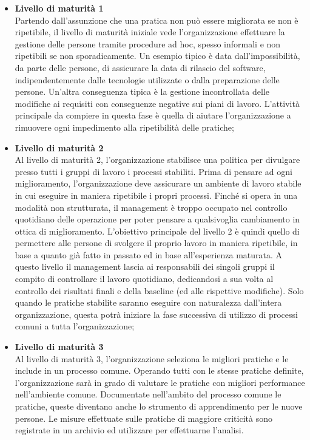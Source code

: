 \begin{itemize}
\item \textbf{Livello di maturità 1}\\
Partendo dall'assunzione che una pratica non può essere migliorata se non è ripetibile, il livello di maturità iniziale vede l'organizzazione effettuare la gestione delle persone tramite procedure ad hoc, spesso informali e non ripetibili se non sporadicamente. Un esempio tipico è data dall'impossibilità, da parte delle persone, di assicurare la data di rilascio del software, indipendentemente dalle tecnologie utilizzate o dalla preparazione delle persone. Un'altra conseguenza tipica è la gestione incontrollata delle modifiche ai requisiti con conseguenze negative sui piani di lavoro.
L'attività principale da compiere in questa fase è quella di aiutare l'organizzazione a rimuovere ogni impedimento alla ripetibilità delle pratiche;
\item \textbf{Livello di maturità 2}\\
Al livello di maturità 2, l'organizzazione stabilisce una politica per divulgare presso tutti i gruppi di lavoro i processi stabiliti. Prima di pensare ad ogni miglioramento, l'organizzazione deve assicurare un ambiente di lavoro stabile in cui eseguire in maniera ripetibile i propri processi. Finché si opera in una modalità non strutturata, il management è troppo occupato nel controllo quotidiano delle operazione per poter pensare a qualsivoglia cambiamento in ottica di miglioramento. L'obiettivo principale del livello 2 è quindi quello di permettere alle persone di svolgere il proprio lavoro in maniera ripetibile, in base a quanto già fatto in passato ed in base all'esperienza maturata. A questo livello il management lascia ai responsabili dei singoli gruppi il compito di controllare il lavoro quotidiano, dedicandosi a sua volta al controllo dei risultati finali e della baseline (ed alle rispettive modifiche).
Solo quando le pratiche stabilite saranno eseguire con naturalezza dall'intera organizzazione, questa potrà iniziare la fase successiva di utilizzo di processi comuni a tutta l'organizzazione;
\item \textbf{Livello di maturità 3}\\
Al livello di maturità 3, l'organizzazione seleziona le migliori pratiche e le include in un processo comune. Operando tutti con le stesse pratiche definite, l'organizzazione sarà in grado di valutare le pratiche con migliori performance nell'ambiente comune. Documentate nell'ambito del processo comune le pratiche, queste diventano anche lo strumento di apprendimento per le nuove persone. Le misure effettuate sulle pratiche di maggiore criticità sono registrate in un archivio ed utilizzare per effettuarne l'analisi.

\end{itemize}
